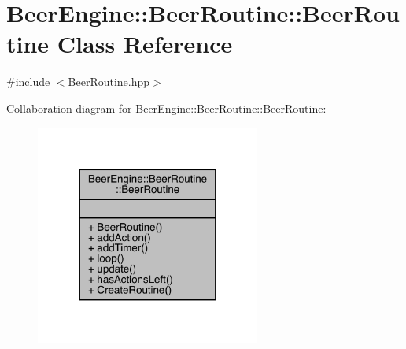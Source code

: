\hypertarget{class_beer_engine_1_1_beer_routine_1_1_beer_routine}{}\section{Beer\+Engine\+:\+:Beer\+Routine\+:\+:Beer\+Routine Class Reference}
\label{class_beer_engine_1_1_beer_routine_1_1_beer_routine}


{\ttfamily \#include $<$Beer\+Routine.\+hpp$>$}



Collaboration diagram for Beer\+Engine\+:\+:Beer\+Routine\+:\+:Beer\+Routine\+:\nopagebreak
\begin{figure}[H]
\begin{center}
\leavevmode
\includegraphics[width=209pt]{class_beer_engine_1_1_beer_routine_1_1_beer_routine__coll__graph}
\end{center}
\end{figure}
